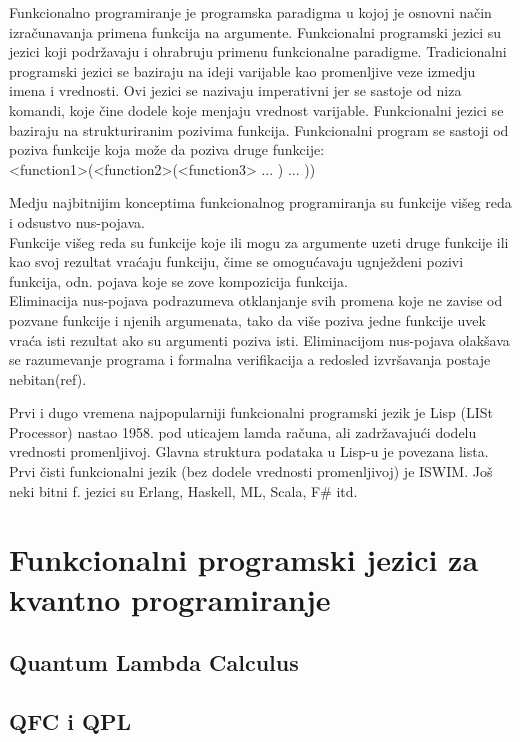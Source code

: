 \documentclass[a4paper]{article}
\begin{document}
{Funkcionalno programiranje je programska paradigma u kojoj je osnovni način izračunavanja primena funkcija na argumente.
Funkcionalni programski jezici su jezici koji podržavaju i ohrabruju primenu funkcionalne paradigme.
Tradicionalni programski jezici se baziraju na ideji varijable kao promenljive veze izmedju imena i vrednosti. Ovi jezici se nazivaju 
imperativni jer se sastoje od niza komandi, koje čine dodele koje menjaju vrednost varijable.
Funkcionalni jezici se baziraju na strukturiranim pozivima funkcija. Funkcionalni program se sastoji od poziva funkcije koja može da
poziva druge funkcije:\\
<function1>(<function2>(<function3> ... ) ... ))

Medju najbitnijim konceptima funkcionalnog programiranja su funkcije višeg reda i odsustvo nus-pojava. \\
Funkcije višeg reda su funkcije koje ili mogu za argumente uzeti druge funkcije ili kao svoj rezultat vraćaju funkciju, čime se omogućavaju ugnježdeni pozivi funkcija, odn. pojava koje se zove kompozicija funkcija.\\
Eliminacija nus-pojava podrazumeva otklanjanje svih promena koje ne zavise od pozvane funkcije i njenih argumenata, tako da više poziva jedne funkcije uvek vraća isti rezultat ako su argumenti poziva isti. Eliminacijom nus-pojava olakšava se razumevanje programa i formalna 
verifikacija a redosled izvršavanja postaje nebitan(ref).\par
Prvi i dugo vremena najpopularniji funkcionalni programski jezik je Lisp (LISt Processor) nastao 1958. pod uticajem lamda računa, ali 
zadržavajući dodelu vrednosti promenljivoj. Glavna struktura podataka u Lisp-u je povezana lista. Prvi čisti funkcionalni jezik 
(bez dodele vrednosti promenljivoj) je ISWIM. Još neki bitni f. jezici su Erlang, Haskell, ML, Scala, F\# itd.

\section{Funkcionalni programski jezici za kvantno programiranje}
\label{sec:funcprl_qp}


\subsection{Quantum Lambda Calculus}
\label{sec:lambdacalc}


\subsection{QFC i QPL}\cite{qfc}
\label{sec:qfc_qml}

}
\end{document}
